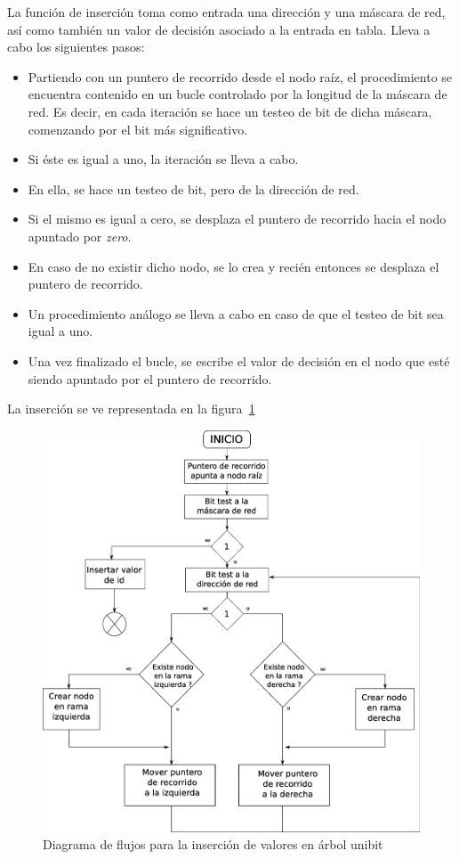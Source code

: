 La función de inserción toma como entrada una dirección y una máscara de red, así como también un valor de decisión asociado a la entrada en tabla. Lleva a cabo los siguientes pasos:
\begin{itemize}
	\item Partiendo con un puntero de recorrido desde el nodo raíz, el procedimiento se encuentra contenido en un bucle controlado por la longitud de la máscara de red. Es decir, en cada iteración se hace un testeo de bit de dicha máscara, comenzando por el bit más significativo. 
	\item Si éste es igual a uno, la iteración se lleva a cabo.
	\item En ella, se hace un testeo de bit, pero de la dirección de red.
	\item Si el mismo es igual a cero, se desplaza el puntero de recorrido hacia el nodo apuntado por \textit{zero}.
	\item En caso de no existir dicho nodo, se lo crea y recién entonces se desplaza el puntero de recorrido.
	\item Un procedimiento análogo se lleva a cabo en caso de que el testeo de bit sea igual a uno.
	\item Una vez finalizado el bucle, se escribe el valor de decisión en el nodo que esté siendo apuntado por el puntero de recorrido.
\end{itemize}

La inserción se ve representada en la figura~\ref{fig:utlinsertfc}

\begin{figure}[H]
  \centering
	\includegraphics[scale=0.35]{4-implementacion/graf/utlinsert.eps}
  \caption{Diagrama de flujos para la inserción de valores en árbol unibit}
  \label{fig:utlinsertfc}
\end{figure}


